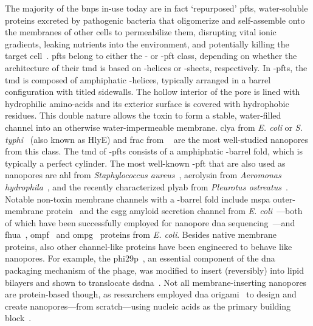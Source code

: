 The majority of the \glspl{bnp} in-use today are in fact `repurposed' \glspl{pft}, water-soluble proteins
excreted by pathogenic bacteria that oligomerize and self-assemble onto the membranes of other cells to
permeabilize them, disrupting vital ionic gradients, leaking nutrients into the environment, and potentially
killing the target cell~\cite{Peraro-2015}. \Glspl{pft} belong to either the \ta- or \tb-\gls{pft} class,
depending on whether the architecture of their \gls{tmd} is based on \ta-helices or \tb-sheets, respectively.
In \ta-\glspl{pft}, the \gls{tmd} is composed of amphiphatic \ta-helices, typically arranged in a barrel
configuration with titled sidewalls. The hollow interior of the pore is lined with hydrophilic amino-acids and
its exterior surface is covered with hydrophobic residues. This double nature allows the toxin to form a
stable, water-filled channel into an otherwise water-impermeable membrane. \Gls{clya} from \textit{E. coli} or
\textit{S. typhi}~\cite{Mueller-2009} (also known as HlyE) and \gls{frac} from ~\cite{Tanaka-2015} are the most well-studied nanopores from this class. The \gls{tmd} of
\tb-\glspl{pft} consists of a amphiphatic \tb-barrel fold, which is typically a perfect cylinder. The most
well-known \tb-\gls{pft} that are also used as nanopores are \gls{ahl} from \textit{Staphylococcus
aureus}~\cite{Song-1996}, aerolysin from \textit{Aeromonas hydrophila}~\cite{Iacovache-2016}, and the recently
characterized \gls{plyab} from \textit{Pleurotus ostreatus}~\cite{Lukoyanova-Kondos-2015}. Notable non-toxin
membrane channels with a \tb-barrel fold include \gls{mspa} outer-membrane protein~\cite{Faller-2004} and the
\gls{csgg} amyloid secretion channel from \textit{E. coli}~\cite{Goyal-2014}---both of which have been
successfully employed for nanopore \gls{dna} sequencing~\cite{Manrao-2012,Brown-2016}---and
\gls{fhua}~\cite{Locher-1998}, \gls{ompf}~\cite{Yamashita-2008} and \gls{ompg}~\cite{Subbarao-2006} proteins
from \textit{E. coli}. Besides native membrane proteins, also other channel-like proteins have been engineered
to behave like nanopores. For example, the \gls{phi29p}~\cite{Xu-2019}, an essential component of the
\gls{dna} packaging mechanism of the  phage, was modified to insert (reversibly) into lipid bilayers
and shown to translocate \gls{dsdna}~\cite{Wendell-2009}. Not all membrane-inserting nanopores are
protein-based though, as researchers employed \gls{dna} origami~\cite{Rothemund-2006} to design and create
nanopores---from scratch---using nucleic acids as the primary building
block~\cite{Bell-2011,Langecker-2012,Burns-2013,Bell-2014,Gopfrich-2016,Gopfrich-2019}.


